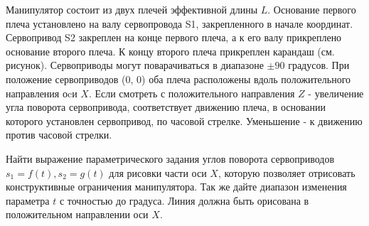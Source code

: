 
Манипулятор состоит из двух плечей эффективной длины $L$. Основание первого плеча установлено на валу сервопровода S1, закрепленного в начале координат. Сервопривод S2 закреплен на конце первого плеча, а к его валу прикреплено основание второго плеча. К концу второго плеча прикреплен карандаш (см. рисунок). Сервоприводы могут поварачиваться в диапазоне $\pm 90$ градусов. При положение сервоприводов (0\textdegree, 0\textdegree) оба плеча расположены вдоль положительного направления оcи $X$. Если смотреть с положительного направления $Z$ - увеличение угла поворота сервопривода, соответствует движению плеча, в основании которого установлен сервопривод, по часовой стрелке. Уменьшение - к движению против часовой стрелки.


Найти выражение параметрического задания углов поворота сервоприводов $s_1 = f(t), s_2 = g(t)$ для рисовки части оси $X$, которую позволяет отрисовать конструктивные ограничения манипулятора. Так же дайте диапазон изменения параметра $t$ с точностью до градуса. Линия должна быть орисована в положительном направлении оси $X$.